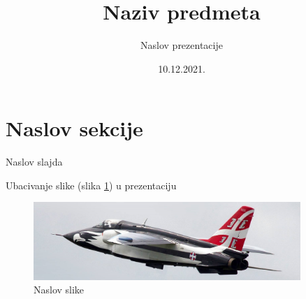 \documentclass[12pt]{beamer}
\title[Naziv predmeta]{Naziv predmeta} %
\subtitle{Naslov prezentacije} %
\date{10.12.2021.} %
\institute[Katedra za vazduhoplovstvo]{\textbf{Katedra za vazduhoplovstvo} \\ Mašinski fakultet \\ Univerziteta u Beogradu}
\begin{document}
{
	\maketitle
}
\addtocounter{framenumber}{-1} %

\section{Naslov sekcije}

\begin{frame}{Naslov slajda}

Ubacivanje slike (slika \ref{orao}) u prezentaciju %

\begin{figure}
    \centering
    \includegraphics[width=0.9\textwidth]{orao}
    \caption{Naslov slike}
    \label{orao}
\end{figure}
\end{frame}
\end{document}
